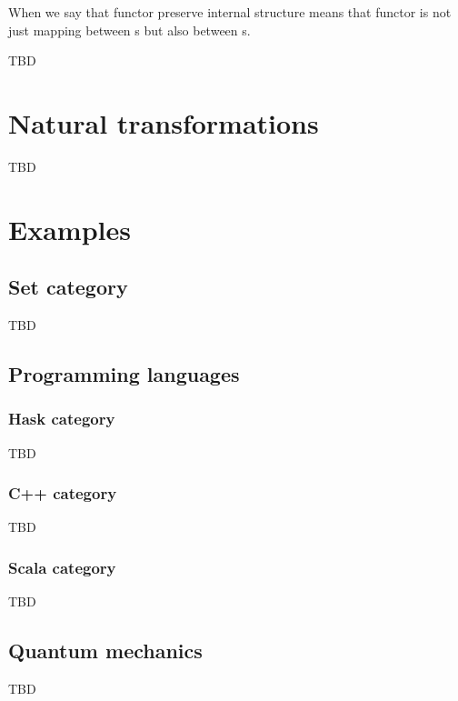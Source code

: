 \begin{remark}[Functor]
When we say that functor preserve internal structure means that
functor is not just mapping between s but also
between s.  
\end{remark}

\begin{definition}[Bifunctor]
TBD
\end{definition}

\section{Natural transformations}

TBD

\section{Examples}

\subsection{\textbf{Set} category}
TBD

\subsection{Programming languages}

\subsubsection{\textbf{Hask} category}
TBD

\subsubsection{\textbf{C++} category}
TBD

\subsubsection{\textbf{Scala} category}
TBD

\subsection{Quantum mechanics}
TBD

